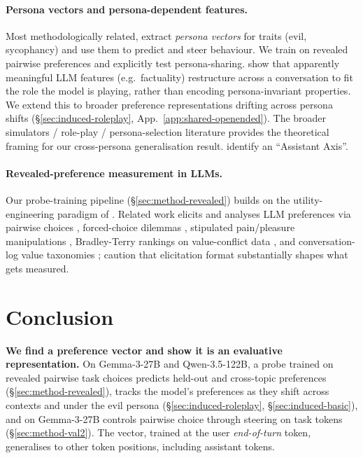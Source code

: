 \documentclass{article}
\begin{document}
\paragraph{Persona vectors and persona-dependent features.} Most methodologically related, \citet{chen2025personavectors} extract \emph{persona vectors} for traits (evil, sycophancy) and use them to predict and steer behaviour. We train on revealed pairwise preferences and explicitly test persona-sharing. \citet{lampinen2026notdeeper} show that apparently meaningful LLM features (e.g.\ factuality) restructure across a conversation to fit the role the model is playing, rather than encoding persona-invariant properties. We extend this to broader preference representations drifting across persona shifts (\S\ref{sec:induced-roleplay}, App.~\ref{app:shared-openended}). The broader simulators / role-play / persona-selection literature \citep{andreas2022agentmodels,janus2022simulators,shanahan2023roleplay,marks2026personaselection} provides the theoretical framing for our cross-persona generalisation result. \citet{lu2026assistantaxis} identify an ``Assistant Axis''.

\paragraph{Revealed-preference measurement in LLMs.} Our probe-training pipeline (\S\ref{sec:method-revealed}) builds on the utility-engineering paradigm of \citet{mazeika2025utility}. Related work elicits and analyses LLM preferences via pairwise choices \citep{gu2025statedrevealed}, forced-choice dilemmas \citep{chiu2025airiskdilemmas}, stipulated pain/pleasure manipulations \citep{keeling2024painpleasure}, Bradley-Terry rankings on value-conflict data \citep{hua2026valuerankings,zhang2025stresstest}, and conversation-log value taxonomies \citep{huang2025valueswild}; \citet{khan2025randomness} caution that elicitation format substantially shapes what gets measured.

\section{Conclusion}
\label{sec:conclusion}

\textbf{We find a preference vector and show it is an evaluative representation.} On Gemma-3-27B and Qwen-3.5-122B, a probe trained on revealed pairwise task choices predicts held-out and cross-topic preferences (\S\ref{sec:method-revealed}), tracks the model's preferences as they shift across contexts and under the evil persona (\S\ref{sec:induced-roleplay}, \S\ref{sec:induced-basic}), and on Gemma-3-27B controls pairwise choice through steering on task tokens (\S\ref{sec:method-val2}). The vector, trained at the user \textit{end-of-turn} token, generalises to other token positions, including assistant tokens.
\end{document}
